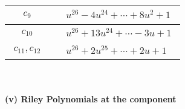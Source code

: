 \documentclass[1p]{elsarticle_modified}
\theoremstyle{definition}
\begin{document}
\begin{tabular}{m{50pt}|m{274pt}}
\hline $$\begin{aligned}c_{9}\end{aligned}$$&$\begin{aligned}
&u^{26}-4 u^{24}+\cdots+8 u^2+1
\end{aligned}$\\
\hline $$\begin{aligned}c_{10}\end{aligned}$$&$\begin{aligned}
&u^{26}+13 u^{24}+\cdots-3 u+1
\end{aligned}$\\
\hline $$\begin{aligned}c_{11},c_{12}\end{aligned}$$&$\begin{aligned}
&u^{26}+2 u^{25}+\cdots+2 u+1
\end{aligned}$\\
\hline
\end{tabular}\\~\\
\newpage\renewcommand{\arraystretch}{1}
\flushleft \textbf{(v) Riley Polynomials at the component}\newline \\
\end{document}
